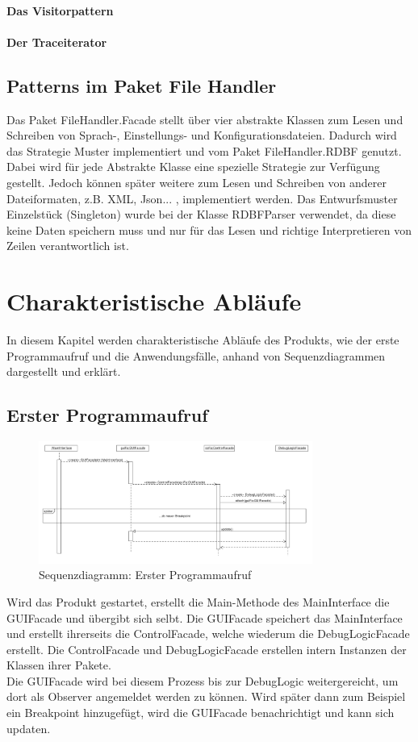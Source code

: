 \documentclass[parskip=full]{scrartcl}
\begin{document}
\paragraph{Das Visitorpattern}
\paragraph{Der Traceiterator}
\subsection{Patterns im Paket File Handler}
Das Paket FileHandler.Facade stellt über vier abstrakte Klassen zum Lesen und Schreiben von Sprach-, Einstellungs- und Konfigurationsdateien. Dadurch wird das Strategie Muster implementiert und vom Paket FileHandler.RDBF genutzt. Dabei wird für jede Abstrakte Klasse eine spezielle Strategie zur Verfügung gestellt. Jedoch können später weitere zum Lesen und Schreiben von anderer Dateiformaten, z.B. XML, Json... , implementiert werden.
Das Entwurfsmuster Einzelstück (Singleton) wurde bei der Klasse RDBFParser verwendet, da diese keine Daten speichern muss und nur für das Lesen und richtige Interpretieren von Zeilen verantwortlich ist.

\newpage
\section{Charakteristische Abläufe}\label{charAbl}
In diesem Kapitel werden charakteristische Abläufe des Produkts, wie der erste Programmaufruf und die
Anwendungsfälle, anhand von Sequenzdiagrammen dargestellt und erklärt.

\subsection{Erster Programmaufruf}
\begin{figure}[!h]
\centering
\includegraphics[width=0.8\textwidth]{diagrammIdeenUmlet/SequenceDiagrams/seq_firstCallPDF.pdf}
\caption{Sequenzdiagramm: Erster Programmaufruf}
\end{figure}
Wird das Produkt gestartet, erstellt die Main-Methode des MainInterface die GUIFacade und übergibt sich selbt.
Die GUIFacade speichert das MainInterface und erstellt ihrerseits die ControlFacade, welche wiederum
die DebugLogicFacade erstellt.
Die ControlFacade und DebugLogicFacade erstellen intern Instanzen der Klassen ihrer Pakete. \\
Die GUIFacade wird bei diesem Prozess bis zur DebugLogic weitergereicht, um dort als Observer angemeldet werden
zu können. Wird später dann zum Beispiel ein Breakpoint hinzugefügt, wird die GUIFacade benachrichtigt und
kann sich updaten.
\end{document}
